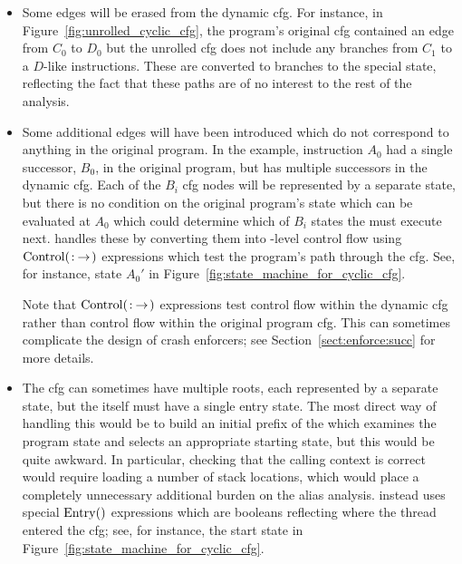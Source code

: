 \begin{itemize}
\item
  Some edges will be erased from the dynamic \gls{cfg}.  For instance,
  in Figure~\ref{fig:unrolled_cyclic_cfg}, the program's original
  \gls{cfg} contained an edge from $C_0$ to $D_0$ but the unrolled
  \gls{cfg} does not include any branches from $C_1$ to a $D$-like
  instructions.  These are converted to branches to the special
  {\stUnreached} state, reflecting the fact that these paths are of no
  interest to the rest of the analysis.

\item
  Some additional edges will have been introduced which do not
  correspond to anything in the original program.  In the example,
  instruction $A_0$ had a single successor, $B_0$, in the original
  program, but has multiple successors in the dynamic \gls{cfg}.  Each
  of the $B_i$ \gls{cfg} nodes will be represented by a separate
  {\StateMachine} state, but there is no condition on the original
  program's state which can be evaluated at $A_0$ which could
  determine which of $B_i$ states the {\StateMachine} must execute
  next.  {\Technique} handles these by converting them into
  \StateMachine-level control flow using
  $\mathrm{Control}(\mathrm{}\!:\!\mathrm{}\!\rightarrow\!\mathrm{})$
  expressions which test the program's path through the \gls{cfg}.
  See, for instance, state $A_0'$ in
  Figure~\ref{fig:state_machine_for_cyclic_cfg}.

  Note that $\mathrm{Control}(\mathrm{}\!:\!\mathrm{}\!\rightarrow\!\mathrm{})$ expressions test control flow within
  the dynamic \gls{cfg} rather than control flow within the original
  program \gls{cfg}.  This can sometimes complicate the design of
  crash enforcers; see Section~\ref{sect:enforce:succ} for more
  details.

\item
  The \gls{cfg} can sometimes have multiple roots, each
  represented by a separate {\StateMachine} state, but the
  {\StateMachine} itself must have a single entry state.  The most
  direct way of handling this would be to build an initial prefix of
  the {\StateMachine} which examines the program state and selects an
  appropriate starting state, but this would be quite awkward.  In
  particular, checking that the calling context is correct would
  require loading a number of stack locations, which would place a
  completely unnecessary additional burden on the alias analysis.
  {\Technique} instead uses special $\mathrm{Entry}()$ expressions which
  are booleans reflecting where the thread entered the \gls{cfg}; see, for
  instance, the start state in
  Figure~\ref{fig:state_machine_for_cyclic_cfg}.

\end{itemize}


